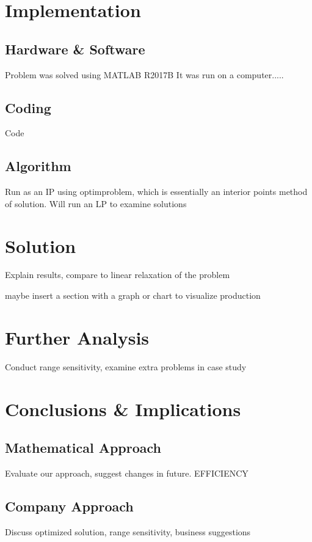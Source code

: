 \documentclass{article}
\begin{document}
\section{Implementation}
\subsection{Hardware \& Software}
Problem was solved using MATLAB R2017B  It was run on a computer.....
\subsection{Coding}
Code
\subsection{Algorithm}
Run as an IP using optimproblem, which is essentially an interior points method of solution.  Will run an LP to examine solutions
\section{Solution}
Explain results, compare to linear relaxation of the problem
\par
maybe insert a section with a graph or chart to visualize production
\section{Further Analysis}
Conduct range sensitivity, examine extra problems in case study
\section{Conclusions \& Implications}
\subsection{Mathematical Approach}
Evaluate our approach, suggest changes in future.  EFFICIENCY
\subsection{Company Approach}
Discuss optimized solution, range sensitivity, business suggestions
	\newpage
	\begin{thebibliography}{9}

\end{thebibliography}
\end{document}
